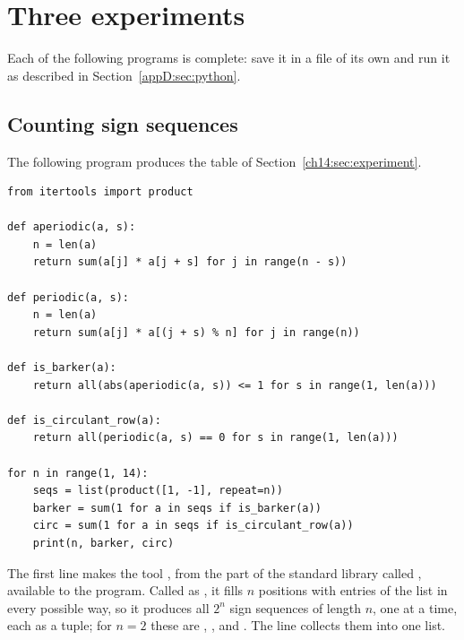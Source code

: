 \section{Three experiments}\label{appD:sec:experiments}
Each of the following programs is complete: save it in a file of its own and run it as described in Section~\ref{appD:sec:python}.

\subsection*{Counting sign sequences}
The following program produces the table of Section~\ref{ch14:sec:experiment}.
\begin{lstlisting}
from itertools import product

def aperiodic(a, s):
    n = len(a)
    return sum(a[j] * a[j + s] for j in range(n - s))

def periodic(a, s):
    n = len(a)
    return sum(a[j] * a[(j + s) % n] for j in range(n))

def is_barker(a):
    return all(abs(aperiodic(a, s)) <= 1 for s in range(1, len(a)))

def is_circulant_row(a):
    return all(periodic(a, s) == 0 for s in range(1, len(a)))

for n in range(1, 14):
    seqs = list(product([1, -1], repeat=n))
    barker = sum(1 for a in seqs if is_barker(a))
    circ = sum(1 for a in seqs if is_circulant_row(a))
    print(n, barker, circ)
\end{lstlisting}
The first line makes the tool , from the part of the standard library called , available to the program. Called as , it fills $n$ positions with entries of the list \code{[1, -1]} in every possible way, so it produces all $2^n$ sign sequences of length $n$, one at a time, each as a tuple; for $n=2$ these are , ,  and . The line  collects them into one list.

